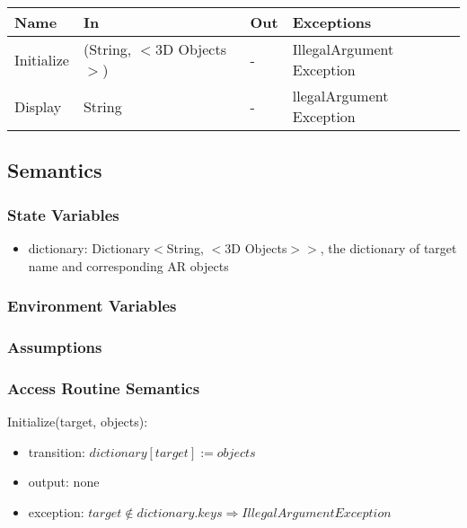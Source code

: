 \documentclass[12pt, titlepage]{article}
\begin{document}
\begin{center}
\begin{tabular}{p{2cm} p{4cm} p{4cm} p{2cm}}
\hline
\textbf{Name} & \textbf{In} & \textbf{Out} & \textbf{Exceptions} \\
\hline
Initialize & (String, $<$3D Objects$>$) & - & IllegalArgument Exception\\
Display & String & - & llegalArgument Exception \\

\hline
\end{tabular}
\end{center}

\subsection{Semantics}

\subsubsection{State Variables}

\begin{itemize}
\item dictionary: Dictionary$<$String, $<$3D Objects$>$$>$, the dictionary of target name and corresponding AR objects
\end{itemize}

\subsubsection{Environment Variables}

\subsubsection{Assumptions}

\subsubsection{Access Routine Semantics}

\noindent Initialize(target, objects):
\begin{itemize}
\item transition: $dictionary[target] := objects$
\item output: none
\item exception: $target \notin dictionary.keys \Rightarrow IllegalArgument Exception$
\end{itemize}
\end{document}

